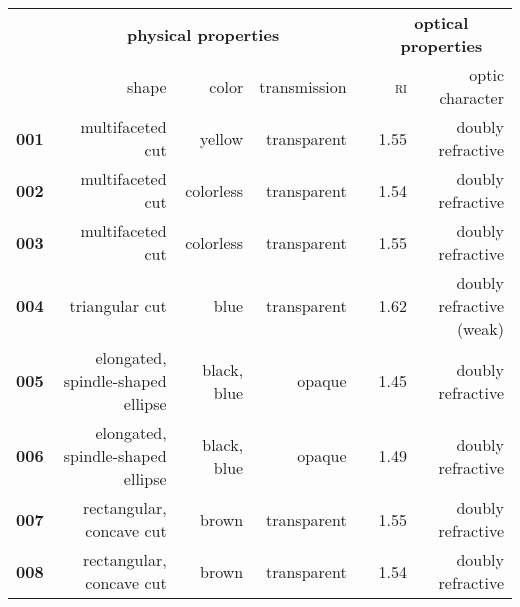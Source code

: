 \documentclass[border=0pt]{standalone}
\begin{document}
\centering
{\renewcommand{\arraystretch}{1.2}
\begin{tabular}{lrrrrrr}
\hline
                                   & \multicolumn{3}{c}{\textbf{physical properties}}                                                                                                                  & & \multicolumn{2}{c}{\textbf{optical properties}}                                                                                      \\ \cline{2-4} \cline{6-7}
 & shape & color & transmission & & \textsc{ri} & optic character \\ \hline
\textbf{001}                                & multifaceted cut                   & yellow                                     & transparent                               &  & 1.55                                          & doubly refractive                            \\
\textbf{002}                                & multifaceted cut                   & colorless                                  & transparent                               &  & 1.54                                          & doubly refractive                            \\
\textbf{003}                                & multifaceted cut                   & colorless                                  & transparent                               &  & 1.55                                          & doubly refractive                            \\
\textbf{004}                                & triangular cut                     & blue                                       & transparent                               &  & 1.62                                          & doubly refractive (weak)                     \\
\textbf{005}                                & elongated, spindle-shaped ellipse  & black, blue                                      & opaque                                    &  & 1.45                                          & doubly refractive                            \\
\textbf{006}                                & elongated, spindle-shaped ellipse  & black, blue                                      & opaque                                    &  & 1.49                                          & doubly refractive                            \\
\textbf{007}                                & rectangular, concave cut           & brown                                      & transparent                               &  & 1.55                                          & doubly refractive                            \\
\textbf{008}                                & rectangular, concave cut           & brown                                      & transparent                               &  & 1.54                                          & doubly refractive                            \\ \hline
\end{tabular}}
\end{document}
